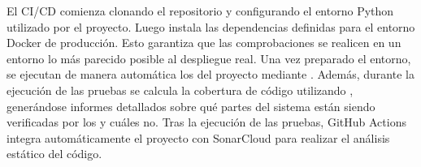 El  CI/CD comienza clonando el repositorio y configurando el entorno Python utilizado por el proyecto. Luego instala las dependencias definidas para el entorno Docker de producción. Esto garantiza que las comprobaciones se realicen en un entorno lo más parecido posible al despliegue real. Una vez preparado el entorno, se ejecutan de manera automática los  del proyecto mediante . Además, durante la ejecución de las pruebas se calcula la cobertura de código utilizando , generándose informes detallados sobre qué partes del sistema están siendo verificadas por los  y cuáles no. Tras la ejecución de las pruebas, GitHub Actions integra automáticamente el proyecto con SonarCloud para realizar el análisis estático del código. 